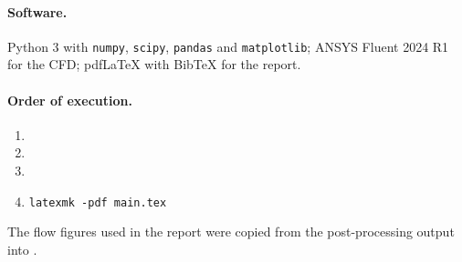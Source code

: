 \paragraph{Software.} Python 3 with \texttt{numpy}, \texttt{scipy}, \texttt{pandas} and \texttt{matplotlib}; ANSYS Fluent 2024 R1 for the CFD; pdf\LaTeX{} with BibTeX for the report.

\paragraph{Order of execution.}
\begin{enumerate}
\item {}
\item {}
\item {}
\item \texttt{latexmk -pdf main.tex}
\end{enumerate}
The flow figures used in the report were copied from the post-processing output into .
